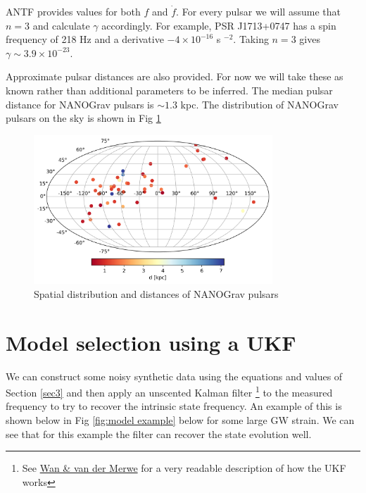 \documentclass{tufte-handout} %
\begin{document}
\noindent ANTF provides values for both $f$ and $\dot{f}$. For every pulsar we will assume that $n=3$ and calculate $\gamma$ accordingly. For example, PSR J1713+0747 has a spin frequency of 218 Hz and a derivative $-4 \times 10^{-16}$ s $^{-2}$. Taking $n=3$ gives $\gamma \sim 3.9 \times 10^{-23}$. \newline 


\noindent Approximate pulsar distances are also provided. For now we will take these as known rather than additional parameters to be inferred. The median pulsar distance for NANOGrav pulsars is $\sim 1.3$ kpc. The distribution of NANOGrav pulsars on the sky is shown in Fig \ref{fig:pulsar_distrib}



\begin{figure}
\includegraphics[width=0.8\textwidth]{images/pulsars}
\caption{Spatial distribution and distances of NANOGrav pulsars}
\label{fig:pulsar_distrib}
\end{figure}


\newpage 
\section{Model selection using a UKF}
\noindent We can construct some noisy synthetic data using the equations and values of Section \ref{sec3} and then apply an unscented Kalman filter \footnote{See \href{https://groups.seas.harvard.edu/courses/cs281/papers/unscented.pdf}{Wan \& van der Merwe} for a very readable description of how the UKF works } to the measured frequency to try to recover the intrinsic state frequency. An example of this is shown below in Fig \ref{fig:model example} below for some large GW strain. We can see that for this example the filter can recover the state evolution well. 
\end{document}
